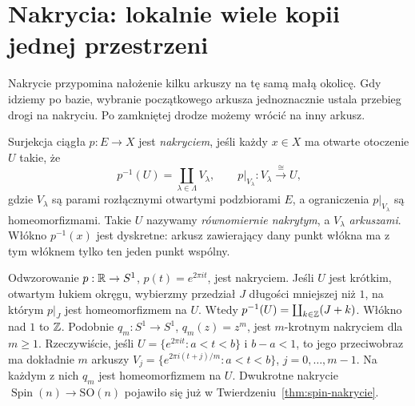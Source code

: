 \section{Nakrycia: lokalnie wiele kopii jednej przestrzeni}
\label{sec:nakrycia}

Nakrycie przypomina nałożenie kilku arkuszy
na tę samą małą okolicę. Gdy idziemy po bazie,
wybranie początkowego arkusza jednoznacznie
ustala przebieg drogi na nakryciu.
Po zamkniętej drodze możemy wrócić na inny arkusz.

\begin{definicja}
\label{def:nakrycie}
Surjekcja ciągła $p:E\to X$ jest \emph{nakryciem},
jeśli każdy $x\in X$ ma otwarte otoczenie $U$
takie, że
\[
 p^{-1}(U)=\coprod_{\lambda\in\Lambda}V_\lambda,
 \qquad
 p|_{V_\lambda}:V_\lambda\xrightarrow{\cong}U,
\]
gdzie $V_\lambda$ są parami rozłącznymi
otwartymi podzbiorami $E$, a ograniczenia $p|_{V_\lambda}$
są homeomorfizmami.
Takie $U$ nazywamy \emph{równomiernie nakrytym},
a $V_\lambda$ \emph{arkuszami}.
Włókno $p^{-1}(x)$ jest dyskretne: arkusz zawierający
dany punkt włókna ma z tym włóknem tylko ten jeden
punkt wspólny.
\end{definicja}

\begin{przyklad}
\label{prz:exp-nakrycie}
Odwzorowanie $p:\mathbb{R}\to S^1$, $p(t)=e^{2\pi i t}$,
jest nakryciem. Jeśli $U$ jest krótkim,
otwartym łukiem okręgu, wybierzmy przedział
$J$ długości mniejszej niż $1$, na którym
$p|_J$ jest homeomorfizmem na $U$.
Wtedy $p^{-1}(U)=\coprod_{k\in\mathbb{Z}}(J+k)$.
Włókno nad $1$ to $\mathbb{Z}$.
Podobnie $q_m:S^1\to S^1$, $q_m(z)=z^m$,
jest $m$-krotnym nakryciem dla $m\geq1$.
Rzeczywiście, jeśli
$U=\{e^{2\pi it}:a<t<b\}$ i $b-a<1$,
to jego przeciwobraz ma dokładnie $m$ arkuszy
$V_j=\{e^{2\pi i(t+j)/m}:a<t<b\}$,
$j=0,\ldots,m-1$. Na każdym z nich $q_m$
jest homeomorfizmem na $U$.
Dwukrotne nakrycie $\operatorname{Spin}(n)
\to\mathrm{SO}(n)$ pojawiło się już w
Twierdzeniu~\ref{thm:spin-nakrycie}.
\end{przyklad}

